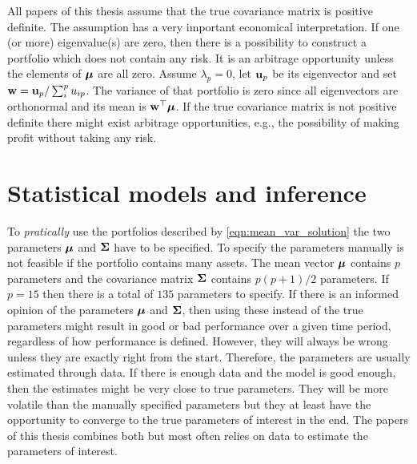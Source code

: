 \documentclass[12pt, oneside]{book}\usepackage{knitr}
\begin{document}
{All papers of this thesis assume that the true covariance matrix is positive definite. 
The assumption has a very important economical interpretation.
If one (or more) eigenvalue(s) are zero, then there is a possibility to construct a portfolio which does not contain any risk.
It is an arbitrage opportunity unless the elements of $\mbox{\boldmath$\mu$}$ are all zero.
Assume $\lambda_p=0$, let $\mathbf{u}_p$ be its eigenvector and set $\mathbf{w} = \mathbf{u}_p / \sum_i^p u_{ip}$. 
The variance of that portfolio is zero since all eigenvectors are orthonormal and its mean is $\mathbf{w}^\top \mbox{\boldmath$\mu$}$.
If the true covariance matrix is not positive definite there might exist arbitrage opportunities, e.g., the possibility of making profit without taking any risk.

\chapter{Statistical models and inference}\label{ch:estim}


To \textit{pratically} use the portfolios described by \eqref{eqn:mean_var_solution} the two parameters $\mbox{\boldmath$\mu$}$ and $\mathbf{\Sigma}$ have to be specified. 
To specify the parameters manually is not feasible if the portfolio contains many assets.
The mean vector $\mbox{\boldmath$\mu$}$ contains $p$ parameters and the covariance matrix $\mathbf{\Sigma}$ contains $p(p+1)/2$ parameters.
If $p=15$ then there is a total of $135$ parameters to specify. 
If there is an informed opinion of the parameters $\mbox{\boldmath$\mu$}$ and $\mathbf{\Sigma}$, then using these instead of the true parameters might result in good or bad performance over a given time period, regardless of how performance is defined.
However, they will always be wrong unless they are exactly right from the start.
Therefore, the parameters are usually estimated through data.
If there is enough data and the model is good enough, then the estimates might be very close to true parameters.
They will be more volatile than the manually specified parameters but they at least have the opportunity to converge to the true parameters of interest in the end.
The papers of this thesis combines both but most often relies on data to estimate the parameters of interest.

}
\end{document}
